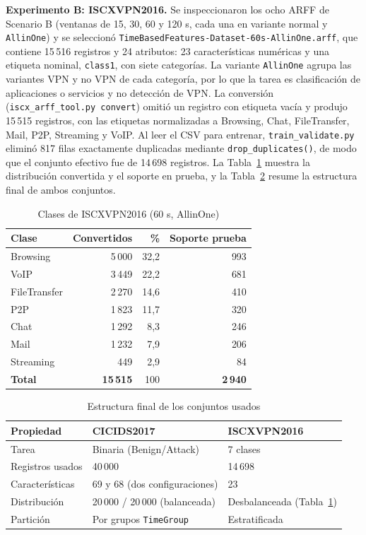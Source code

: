 \documentclass[conference]{IEEEtran}
\begin{document}
\textbf{Experimento B: ISCXVPN2016.} Se inspeccionaron los ocho ARFF de Scenario B (ventanas de 15, 30, 60 y 120 s, cada una en variante normal y \texttt{AllinOne}) y se seleccionó \texttt{TimeBasedFeatures-Dataset-60s-AllinOne.arff}, que contiene 15\,516 registros y 24 atributos: 23 características numéricas y una etiqueta nominal, \texttt{class1}, con siete categorías. La variante \texttt{AllinOne} agrupa las variantes VPN y no VPN de cada categoría, por lo que la tarea es clasificación de aplicaciones o servicios y no detección de VPN. La conversión (\texttt{iscx\_arff\_tool.py convert}) omitió un registro con etiqueta vacía y produjo 15\,515 registros, con las etiquetas normalizadas a Browsing, Chat, FileTransfer, Mail, P2P, Streaming y VoIP. Al leer el CSV para entrenar, \texttt{train\_validate.py} eliminó 817 filas exactamente duplicadas mediante \texttt{drop\_duplicates()}, de modo que el conjunto efectivo fue de 14\,698 registros. La Tabla~\ref{tab:iscx_clases} muestra la distribución convertida y el soporte en prueba, y la Tabla~\ref{tab:estructura} resume la estructura final de ambos conjuntos.

\begin{table}[!tb]
\centering
\footnotesize
\caption{Clases de ISCXVPN2016 (60 s, AllinOne)}
\label{tab:iscx_clases}
\begin{tabular}{lrrr}
\toprule
\textbf{Clase} & \textbf{Convertidos} & \textbf{\%} & \textbf{Soporte prueba} \\
\midrule
Browsing & 5\,000 & 32,2 & 993 \\
VoIP & 3\,449 & 22,2 & 681 \\
FileTransfer & 2\,270 & 14,6 & 410 \\
P2P & 1\,823 & 11,7 & 320 \\
Chat & 1\,292 & 8,3 & 246 \\
Mail & 1\,232 & 7,9 & 206 \\
Streaming & 449 & 2,9 & 84 \\
\midrule
\textbf{Total} & \textbf{15\,515} & 100 & \textbf{2\,940} \\
\bottomrule
\end{tabular}
\end{table}

\begin{table}[!tb]
\centering
\footnotesize
\caption{Estructura final de los conjuntos usados}
\label{tab:estructura}
\begin{tabular}{p{2.2cm}p{2.5cm}p{2.5cm}}
\toprule
\textbf{Propiedad} & \textbf{CICIDS2017} & \textbf{ISCXVPN2016} \\
\midrule
Tarea & Binaria (Benign/Attack) & 7 clases \\
Registros usados & 40\,000 & 14\,698 \\
Características & 69 y 68 (dos configuraciones) & 23 \\
Distribución & 20\,000 / 20\,000 (balanceada) & Desbalanceada (Tabla~\ref{tab:iscx_clases}) \\
Partición & Por grupos \texttt{TimeGroup} & Estratificada \\
\bottomrule
\end{tabular}
\end{table}
\end{document}
